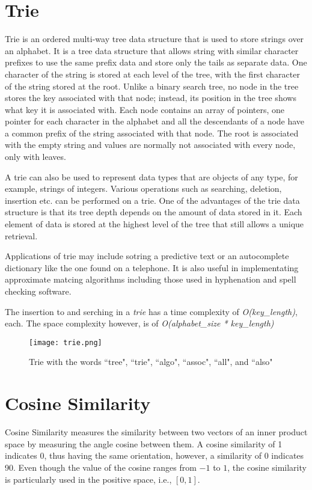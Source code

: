 	\section{Trie}
	\label{sec:trie}
		Trie \cite{germann2009tightly} is an ordered multi-way tree data structure that is used to store strings over an alphabet. It is a tree data structure that allows string with similar character prefixes to use the same prefix data and store only the tails as separate data. One character of the string is stored at each level of the tree, with the first character of the string stored at the root. Unlike a binary search tree, no node in the tree stores the key associated with that node; instead, its position in the tree shows what key it is associated with. Each node contains an array of pointers, one pointer for each character in the alphabet and all the descendants of a node have a common prefix of the string associated with that node. The root is associated with the empty string and values are normally not associated with every node, only with leaves.
		
		A trie can also be used to represent data types that are objects of any type, for example, strings of integers. Various operations such as searching, deletion, insertion etc. can be performed on a trie. One of the advantages of the trie data structure is that its tree depth depends on the amount of data stored in it. Each element of data is stored at the highest level of the tree that still allows a unique retrieval.
		
		Applications of trie may include sotring a predictive text or an autocomplete dictionary like the one found on a telephone. It is also useful in implementating approximate matcing algorithms including those used in hyphenation and spell checking software.
		
		The insertion to and serching in a \emph{trie} has a time complexity of \emph{O(key\_length)}, each. The space complexity however, is of \emph{O(alphabet\_size * key\_length)}
		
		\begin{figure}[h!]
			\centering
			\texttt{[image: trie.png]}
			\caption{Trie with the words ``tree", ``trie", ``algo", ``assoc", ``all", and ``also" \label{trie}}
		\end{figure}
	
	\section{Cosine Similarity}	
	\label{sec:cosine_similarity}
		Cosine Similarity \cite{singhal2001modern} measures the similarity between two vectors of an inner product space by measuring the angle cosine between them. A cosine similarity of 1 indicates 0\textdegree, thus having the same orientation, however, a similarity of 0 indicates 90\textdegree. Even though the value of the cosine ranges from \(-1\) to \(1\), the cosine similarity is particularly used in the positive space, i.e., \([0,1]\).
		
